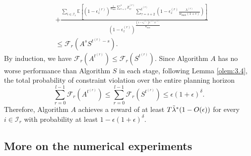 \documentclass[letterpaper, 10 pt, conference]{ieeeconf}  %
\makeatletter
\renewenvironment{proof}[1][\relax]{\par
  \pushQED{\qed}%
  \normalfont \topsep6\p@\@plus6\p@\relax
  \trivlist
  \item[\hskip\labelsep\itshape
    \ifx#1\relax \proofname\else\proofname{} of #1\fi\@addpunct{.}]\ignorespaces
}{%
  \popQED\endtrivlist\@endpefalse
}
\newcommand{\III}{\mathcal{I}}
\theoremstyle{plain}
\theoremstyle{definition}
\theoremstyle{remark}
\makeatother
\begin{document}
\begin{proof}
\begin{subequations}
\begin{alignat}{2}
& + \frac{\sum_{i \in \III_r} \mathbb{E}\left[\left(1-\epsilon^{(r)}_{z}\right)^{\frac{1}{w_{\max}} \sum^{s}_{\tau=1} Z^{(r)}_{i \tau}} \sum^{t^{(r)}}_{\tau=s+2} \left(1-\epsilon^{(r)}_{z} \frac{\lambda^{(r)}}{w_{\max} \left(1+\epsilon\right)}\right)\right]}{\left(1-\epsilon^{(r)}_{z}\right)^{\frac{\left(1-\epsilon^{(r)}_{z}\right) t^{(r)} \lambda^{(r)}}{w_{\max}}}} \nonumber \\
& \leq \mathcal{F}_r\left(A^s S^{t^{(r)}-s}\right). \nonumber
\end{alignat}
\end{subequations}
By induction, we have $\mathcal{F}_r\left(A^{t^{(r)}}\right) \leq \mathcal{F}_r\left(S^{t^{(r)}}\right)$. Since Algorithm $A$ has no worse performance than Algorithm $S$ in each stage, following Lemma \ref{olem:3.4}, the total probability of constraint violation over the entire planning horizon $$\sum^{l-1}_{r=0} \mathcal{F}_r\left(A^{t^{(r)}}\right) \leq \sum^{l-1}_{r=0} \mathcal{F}_r\left(S^{t^{(r)}}\right) \leq \epsilon (1 + \epsilon)^{\delta}.$$ Therefore, Algorithm $A$ achieves a reward of at least $T \Tilde{\lambda}^* (1 - O(\epsilon))$ for every $i \in \III_r$ with probability at least $1 - \epsilon (1 + \epsilon)^{\delta}$.
\end{proof}

\subsection{More on the numerical experiments}
\end{document}
